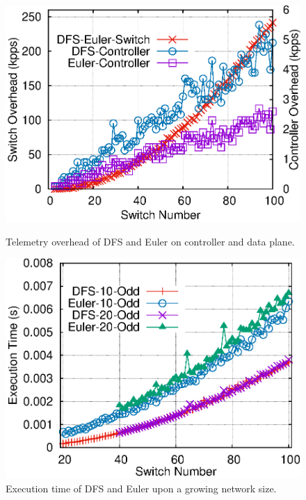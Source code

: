 \begin{figure}[htbp]
	\vspace{-0.0cm}
	\vspace{0.0cm} \includegraphics[width=\linewidth]{figure/overhead.eps}
	  \center
	  \vspace{-0.0cm}
	  \caption{Telemetry overhead of DFS and Euler on controller and data plane.}\label{fig:overhead}
	\endminipage\hfill
			\vspace{-0.0cm} \includegraphics[width=\linewidth]{figure/runtime.eps}
			  \center
			  \vspace{-0.0cm}
			  \caption{Execution time of DFS and Euler upon a growing network size.}\label{fig:runtime}
			\endminipage\hfill

\end{figure}
